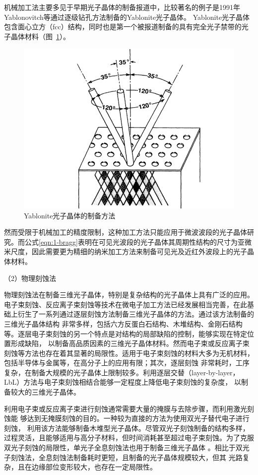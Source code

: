 机械加工法主要多见于早期光子晶体的制备报道中，比较著名的例子是1991年Yablonovitch等通过逐级钻孔方法制备的Yablonite光子晶体\cite{Yablonovitch1991Photonic}。
Yablonite光子晶体包含面心立方（fcc）结构，同时也是第一个被报道制备的具有完全光子禁带的光子晶体材料（图~\ref{fig:yablonite}）。
\begin{figure}[htbp]
	\centering
	\includegraphics[width=0.6\linewidth]{figures/yablonite.png}
	\caption{Yablonite光子晶体的制备方法\cite{Yablonovitch1991Photonic}}
	\label{fig:yablonite}
\end{figure}
然而受限于机械加工的精度限制，这种加工方法只能应用于微波波段的光子晶体研究。而公式\ref{eqn:1-bragg}表明在可见光波段的光子晶体其周期性结构的尺寸为亚微米尺度，因此需要更为精细的纳米加工方法来制备可见光及近红外波段上的光子晶体材料。

（2）物理刻蚀法

物理刻蚀法在制备三维光子晶体，特别是复杂结构的光子晶体上具有广泛的应用。
电子束刻蚀、反应离子束刻蚀等技术在微电子加工方法已经发展相当完善，在此基础上衍生了一系列通过逐层刻蚀方法制备三维光子晶体的方法。通过该方法制备的三维光子晶体结构
非常多样，包括六方反蛋白石结构\cite{Johnson2000ThreeDimensionally}、木堆结构\cite{Lin1998ThreeDimensional,Noda2000Full}、金刚石结构\cite{Qi2004ThreeDimensional}等。逐层电子束刻蚀的另一个特点是对结构的局部缺陷的控制，能够实现在特定位置形成缺陷，
以制备高品质因素的三维光子晶体材料\cite{Blanco2000LargeScale,Juarez2004Selective}。然而电子束或反应离子束刻蚀等方法也存在着其显著的局限性。适用于电子束刻蚀的材料大多为无机材料，包括半导体与金属等，在高分子上的应用有限；其次，逐层刻蚀
非常耗时，工序复杂，在制备大规模的光子晶体上限制较多。利用逐层交替（layer-by-layer，LbL）方法与电子束刻蚀相结合能够一定程度上降低电子束刻蚀的复杂度，
以制备较大的三维光子晶体\cite{Aoki2002ThreeDimensional,Aoki2003Microassembly}。

利用电子束或反应离子束进行刻蚀通常需要大量的掩膜与去除步骤，而利用激光刻蚀能
够达到无掩膜刻蚀的目的。一种较为直接的方法为使用双光子替代电子进行刻蚀，
利用该方法能够制备木堆型光子晶体\cite{Cumpston1999TwoPhoton}。尽管双光子刻蚀制备的结构多样，过程灵活，且能够适用与高分子材料，但时间消耗甚至超过电子束刻蚀。为了克服双光子刻蚀的局限性，单光子全息刻蚀法也用于制备三维光子晶体
\cite{Campbell2000Fabrication}。相比于双光子刻蚀法，全息刻蚀法制备耗时更短，且制备的光子晶体规模较大，但其
光路复杂，且在边缘部位变形较大，也存在一定局限性。

